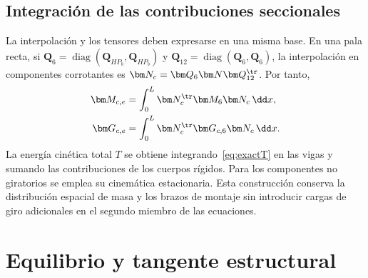 \subsection{Integración de las contribuciones seccionales}
La interpolación y los tensores deben expresarse en una misma base. En una pala recta, si $\bm Q_6=\operatorname{diag}(\bm Q_{HP_b},\bm Q_{HP_b})$ y $\bm Q_{12}=\operatorname{diag}(\bm Q_6,\bm Q_6)$, la interpolación en componentes corrotantes es $\bm N_c=\bm Q_6\bm N\bm Q_{12}^\tr$. Por tanto,
\begin{align}
\bm M_{c,e}&=\int_0^L\bm N_c^\tr\bm M_6\bm N_c\,\dd x,\nonumber\\
\bm G_{c,e}&=\int_0^L\bm N_c^\tr\bm G_{c,6}\bm N_c\,\dd x.
\end{align}
La energía cinética total $T$ se obtiene integrando~\eqref{eq:exactT} en las vigas y sumando las contribuciones de los cuerpos rígidos. Para los componentes no giratorios se emplea su cinemática estacionaria. Esta construcción conserva la distribución espacial de masa y los brazos de montaje sin introducir cargas de giro adicionales en el segundo miembro de las ecuaciones.

\section{Equilibrio y tangente estructural}
